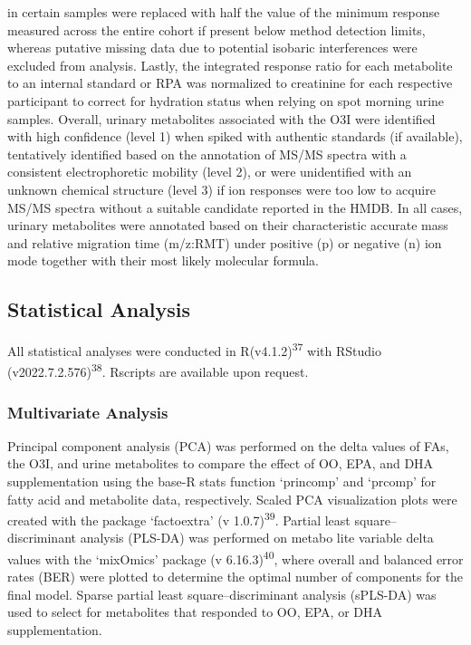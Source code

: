 \documentclass[journal=jacsat,manuscript=article]{achemso}
\begin{document}
in certain samples were replaced with half the value of the minimum
response measured across the entire cohort if present below method
detection limits, whereas putative missing data due to potential
isobaric interferences were excluded from analysis. Lastly, the
integrated response ratio for each metabolite to an internal standard or
RPA was normalized to creatinine for each respective participant to
correct for hydration status when relying on spot morning urine samples.
Overall, urinary metabolites associated with the O3I were identified
with high confidence (level 1) when spiked with authentic standards (if
available), tentatively identified based on the annotation of MS/MS
spectra with a consistent electrophoretic mobility (level 2), or were
unidentified with an unknown chemical structure (level 3) if ion
responses were too low to acquire MS/MS spectra without a suitable
candidate reported in the HMDB. In all cases, urinary metabolites were
annotated based on their characteristic accurate mass and relative
migration time (m/z:RMT) under positive (p) or negative (n) ion mode
together with their most likely molecular formula.

\subsection{Statistical Analysis}\label{statistical-analysis}

All statistical analyses were conducted in R(v4.1.2)\textsuperscript{37}
with RStudio (v2022.7.2.576)\textsuperscript{38}. Rscripts are available
upon request.

\subsubsection{Multivariate Analysis}\label{multivariate-analysis}

Principal component analysis (PCA) was performed on the delta values of
FAs, the O3I, and urine metabolites to compare the effect of OO, EPA,
and DHA supplementation using the base-R stats function `princomp' and
`prcomp' for fatty acid and metabolite data, respectively. Scaled PCA
visualization plots were created with the package `factoextra' (v
1.0.7)\textsuperscript{39}. Partial least square--discriminant analysis
(PLS-DA) was performed on metabo lite variable delta values with the
`mixOmics' package (v 6.16.3)\textsuperscript{40}, where overall and
balanced error rates (BER) were plotted to determine the optimal number
of components for the final model. Sparse partial least
square--discriminant analysis (sPLS-DA) was used to select for
metabolites that responded to OO, EPA, or DHA supplementation.
\end{document}
